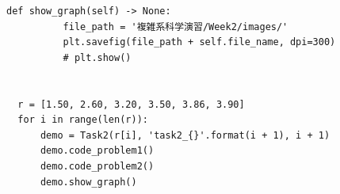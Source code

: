 \begin{lstlisting}[caption=week2.py]
      def show_graph(self) -> None:
          file_path = '複雑系科学演習/Week2/images/'
          plt.savefig(file_path + self.file_name, dpi=300)
          # plt.show()
  
  
  r = [1.50, 2.60, 3.20, 3.50, 3.86, 3.90]
  for i in range(len(r)):
      demo = Task2(r[i], 'task2_{}'.format(i + 1), i + 1)
      demo.code_problem1()
      demo.code_problem2()
      demo.show_graph()
\end{lstlisting}